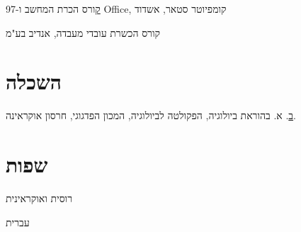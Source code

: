 {\href{https://raw.githubusercontent.com/kiril-u/k-resume-2021-1-template/main/references/computer-programs-office-97.jpg}
	קורס הכרת המחשב ו-97 Office, קומפיוטר סטאר, אשדוד}
{}
{}

{קורס הכשרת עובדי מעבדה, אנדיב בע"מ}
{}
{}

\section{השכלה}

{\href{https://raw.githubusercontent.com/kiril-u/k-resume-2021-1-template/main/references/bachelors-degree-cert.jpg}
	ב. א. בהוראת ביולוגיה, הפקולטה לביולוגיה, המכון הפדגוגי, חרסון אוקראינה.}
{}
{}

\section{שפות}

{רוסית ואוקראינית} 
{}
{}

{עברית}
{}
{}


\unsetRTL